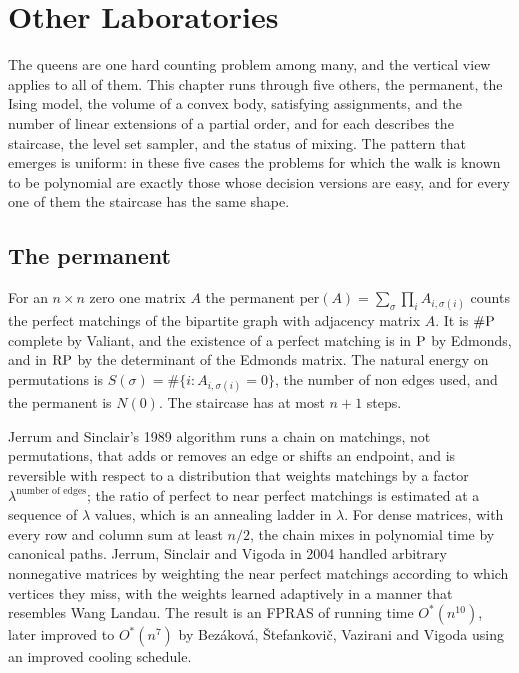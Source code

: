 \chapter{Other Laboratories}
\label{ch:labs}

The queens are one hard counting problem among many, and the vertical view applies to all of them. This chapter runs through five others, the permanent, the Ising model, the volume of a convex body, satisfying assignments, and the number of linear extensions of a partial order, and for each describes the staircase, the level set sampler, and the status of mixing. The pattern that emerges is uniform: in these five cases the problems for which the walk is known to be polynomial are exactly those whose decision versions are easy, and for every one of them the staircase has the same shape.

\section{The permanent}

For an $n \times n$ zero one matrix $A$ the permanent $\mathrm{per}(A) = \sum_\sigma \prod_i A_{i, \sigma(i)}$ counts the perfect matchings of the bipartite graph with adjacency matrix $A$. It is $\#\mathrm{P}$ complete by Valiant, and the existence of a perfect matching is in $\mathrm{P}$ by Edmonds, and in $\mathrm{RP}$ by the determinant of the Edmonds matrix. The natural energy on permutations is $S(\sigma) = \#\{ i : A_{i, \sigma(i)} = 0 \}$, the number of non edges used, and the permanent is $N(0)$. The staircase has at most $n + 1$ steps.

Jerrum and Sinclair's 1989 algorithm runs a chain on matchings, not permutations, that adds or removes an edge or shifts an endpoint, and is reversible with respect to a distribution that weights matchings by a factor $\lambda^{\text{number of edges}}$; the ratio of perfect to near perfect matchings is estimated at a sequence of $\lambda$ values, which is an annealing ladder in $\lambda$. For dense matrices, with every row and column sum at least $n/2$, the chain mixes in polynomial time by canonical paths. Jerrum, Sinclair and Vigoda in 2004 handled arbitrary nonnegative matrices by weighting the near perfect matchings according to which vertices they miss, with the weights learned adaptively in a manner that resembles Wang Landau. The result is an FPRAS of running time $O^*(n^{10})$, later improved to $O^*(n^7)$ by Bez\'akov\'a, \v{S}tefankovi\v{c}, Vazirani and Vigoda using an improved cooling schedule.


